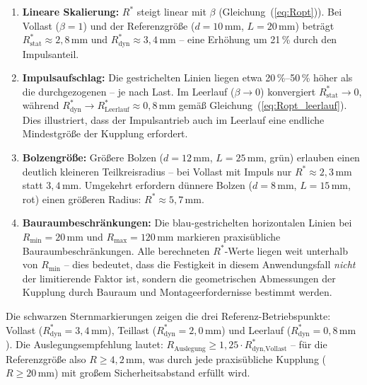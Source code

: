﻿\documentclass[a4paper,12pt]{article}
\begin{document}
\begin{enumerate}
  \item \textbf{Lineare Skalierung:} $R^*$ steigt linear mit $\beta$
    (Gleichung~(\ref{eq:Ropt})). Bei Vollast ($\beta = 1$) und der Referenzgröße
    ($d = 10\,\text{mm}$, $L = 20\,\text{mm}$) beträgt $R^*_\text{stat} \approx 2{,}8\,\text{mm}$
    und $R^*_\text{dyn} \approx 3{,}4\,\text{mm}$ -- eine Erhöhung um 21\,\%
    durch den Impulsanteil.

  \item \textbf{Impulsaufschlag:} Die gestrichelten Linien liegen etwa
    20\,\%--50\,\% höher als die durchgezogenen -- je nach Last. Im Leerlauf
    ($\beta \to 0$) konvergiert $R^*_\text{stat} \to 0$, während
    $R^*_\text{dyn} \to R^*_\text{Leerlauf} \approx 0{,}8\,\text{mm}$ gemäß
    Gleichung~(\ref{eq:Ropt_leerlauf}). Dies illustriert, dass der Impulsantrieb
    auch im Leerlauf eine endliche Mindestgröße der Kupplung erfordert.

  \item \textbf{Bolzengröße:} Größere Bolzen ($d=12\,\text{mm}$, $L=25\,\text{mm}$,
    grün) erlauben einen deutlich kleineren Teilkreisradius -- bei Vollast
    mit Impuls nur $R^* \approx 2{,}3\,\text{mm}$ statt $3{,}4\,\text{mm}$.
    Umgekehrt erfordern dünnere Bolzen ($d=8\,\text{mm}$, $L=15\,\text{mm}$,
    rot) einen größeren Radius: $R^* \approx 5{,}7\,\text{mm}$.

  \item \textbf{Bauraumbeschränkungen:} Die blau-gestrichelten horizontalen
    Linien bei $R_\text{min} = 20\,\text{mm}$ und $R_\text{max} = 120\,\text{mm}$
    markieren praxisübliche Bauraumbeschränkungen. Alle berechneten $R^*$-Werte
    liegen weit unterhalb von $R_\text{min}$ -- dies bedeutet, dass die
    Festigkeit in diesem Anwendungsfall \textit{nicht} der limitierende Faktor ist,
    sondern die geometrischen Abmessungen der Kupplung durch Bauraum und
    Montageerfordernisse bestimmt werden.
\end{enumerate}

Die schwarzen Sternmarkierungen zeigen die drei Referenz-Betriebspunkte:
Vollast ($R^*_\text{dyn} = 3{,}4\,\text{mm}$), Teillast ($R^*_\text{dyn} = 2{,}0\,\text{mm}$)
und Leerlauf ($R^*_\text{dyn} = 0{,}8\,\text{mm}$). Die Auslegungsempfehlung lautet:
$R_\text{Auslegung} \geq 1{,}25 \cdot R^*_\text{dyn,Vollast}$ -- für die
Referenzgröße also $R \geq 4{,}2\,\text{mm}$, was durch jede praxisübliche
Kupplung ($R \geq 20\,\text{mm}$) mit großem Sicherheitsabstand erfüllt wird.
\end{document}
